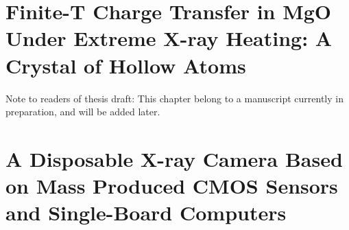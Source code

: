 \documentclass [11pt, proquest, article] {uwthesis}[2016/11/22]
\begin{document}
\chapter{Finite-T Charge Transfer in MgO Under Extreme X-ray Heating: A Crystal of Hollow Atoms}
\label{mgo}
Note to readers of thesis draft: This chapter belong to a manuscript currently in preparation, and will be added later. 

\chapter{A Disposable X-ray Camera Based on Mass Produced CMOS Sensors and
Single-Board Computers}
\label{cmos_ch}







\cleardoublepage
\printbibliography[heading=bibintoc, title={References}]
\end{document}
